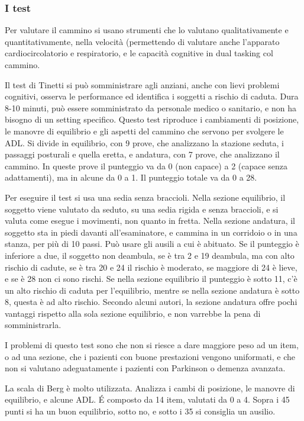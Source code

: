 \subsubsection{I test}
Per valutare il cammino si usano strumenti che lo valutano qualitativamente e
quantitativamente, nella velocità (permettendo di valutare anche l'apparato
cardiocircolatorio e respiratorio, e le capacità cognitive in dual tasking col
cammino. 

Il test di Tinetti si può somministrare agli anziani, anche con lievi problemi
cognitivi, osserva le performance ed identifica i soggetti a rischio di caduta.
Dura 8-10 minuti, può essere somministrato da personale medico o sanitario, e
non ha bisogno di un setting specifico. Questo test riproduce i cambiamenti di
posizione, le manovre di equilibrio e gli aspetti del cammino che servono per
svolgere le ADL. Si divide in equilibrio, con 9 prove, che analizzano la
stazione seduta, i passaggi posturali e quella eretta, e andatura, con 7 prove,
che analizzano il cammino. In queste prove il punteggio va da 0 (non capace) a
2 (capace senza adattamenti), ma in alcune da 0 a 1. Il punteggio totale va da 0
a 28.

Per eseguire il test si usa una sedia senza braccioli. Nella sezione equilibrio,
il soggetto viene valutato da seduto, su una sedia rigida e senza braccioli, e
si valuta come esegue i movimenti, non quanto in fretta. Nella sezione andatura,
il soggetto sta in piedi davanti all'esaminatore, e cammina in un corridoio o in
una stanza, per più di 10 passi. Può usare gli ausili a cui è abituato. Se il
punteggio è inferiore a due, il soggetto non deambula, se è tra 2 e 19 deambula,
ma con alto rischio di cadute, se è tra 20 e 24 il rischio è moderato, se
maggiore di 24 è lieve, e se è 28 non ci sono rischi. Se nella sezione
equilibrio il punteggio è sotto 11, c'è un alto rischio di caduta per
l'equilibrio, mentre se nella sezione andatura è sotto 8, questa è ad alto
rischio. Secondo alcuni autori, la sezione andatura offre pochi vantaggi
rispetto alla sola sezione equilibrio, e non varrebbe la pena di somministrarla.

I problemi di questo test sono che non si riesce a dare maggiore peso ad un
item, o ad una sezione, che i pazienti con buone prestazioni vengono uniformati,
e che non si valutano adeguatamente i pazienti con Parkinson o demenza avanzata.

La scala di Berg è molto utilizzata. Analizza i cambi di posizione, le manovre di
equilibrio, e alcune ADL. \'E composto da 14 item, valutati da 0 a 4. Sopra i 45
punti si ha un buon equilibrio, sotto no, e sotto i 35 si consiglia un ausilio.

